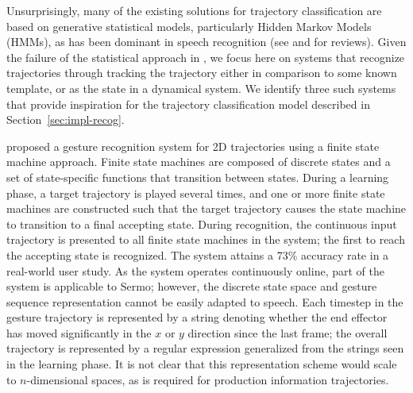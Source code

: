 Unsurprisingly, many of the existing
solutions for trajectory classification
are based on generative statistical models,
particularly Hidden Markov Models (HMMs),
as has been dominant in speech recognition
(see \citealt{mlich2008,nascimento2010}
and \citealt{mitra2007,weinland2011,rautaray2015}
for reviews).
Given the failure of the statistical approach
in \citet{mitra2014},
we focus here on systems
that recognize trajectories
through tracking the trajectory
either in comparison to some known template,
or as the state in a dynamical system.
We identify three such systems
that provide inspiration
for the trajectory classification model
described in Section~\ref{sec:impl-recog}.

\citet{kiliboz2015} proposed
a gesture recognition system
for 2D trajectories
using a finite state machine approach.
Finite state machines are composed of
discrete states and a set of state-specific
functions that transition between states.
During a learning phase,
a target trajectory is played
several times,
and one or more finite state machines
are constructed such that
the target trajectory
causes the state machine
to transition to a final accepting state.
During recognition,
the continuous input trajectory
is presented to all finite state machines
in the system;
the first to reach the accepting state is recognized.
The system attains a 73\% accuracy rate
in a real-world user study.
As the system operates continuously online,
part of the system is applicable to Sermo;
however, the discrete state space and
gesture sequence representation
cannot be easily adapted to speech.
Each timestep in the gesture trajectory
is represented by a string denoting whether the
end effector has moved significantly
in the $x$ or $y$ direction since the last frame;
the overall trajectory is represented
by a regular expression generalized from
the strings seen in the learning phase.
It is not clear that this representation scheme
would scale to $n$-dimensional spaces,
as is required for production information trajectories.

